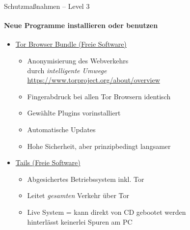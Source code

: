\begin{frame}{Schutzmaßnahmen -- Level 3}
\framesubtitle{Neue Programme installieren oder benutzen}
  \begin{itemize}
    \item \href{https://www.torproject.org}{Tor Browser Bundle (Freie Software)}
    \begin{itemize}
      \item Anonymisierung des Webverkehrs\\durch \emph{\glqq intelligente Umwege\grqq}\\
        {\small\url{https://www.torproject.org/about/overview}}
      \item Fingerabdruck bei allen Tor Browsern identisch
      \item Gewählte Plugins vorinstalliert
      \item Automatische Updates
      \item Hohe Sicherheit, aber prinzipbedingt langsamer
    \end{itemize}
    \pause
    \item \href{https://tails.boum.org}{Tails (Freie Software)}
    \begin{itemize}
      \item Abgesichertes Betriebssystem inkl. Tor
      \item Leitet \emph{gesamten} Verkehr über Tor
      \item Live System = kann direkt von CD gebootet werden\\ hinterlässt keinerlei Spuren am PC
    \end{itemize}
  \end{itemize}
\end{frame}

\endinput

